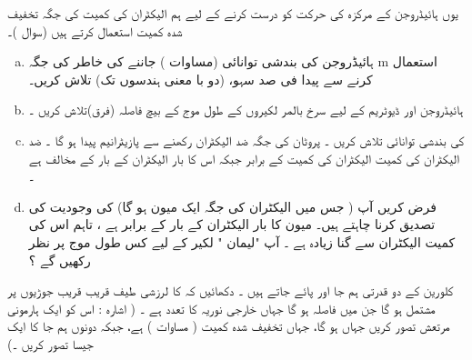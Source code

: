  یوں ہائیڈروجن کے مرکزہ کی حرکت کو درست کرنے کے لیے ہم الیکٹران  کی کمیت کی جگہ تخفیف شدہ کمیت استعمال کرتے ہیں  (سوال )۔ 
\begin{enumerate}[a.]
\item
 ہائیڈروجن کی بندشی  توانائی (مساوات ) جاننے کی خاطر   کی جگہ m استعمال کرنے سے پیدا فی صد  سہو،    (دو با معنی ہندسوں تک)    تلاش کریں۔  
\item
 ہائیڈروجن اور ڈیوٹریم کے لیے   سرخ بالمر لکیروں      کے طول موج کے بیچ    فاصلہ  (فرق)تلاش کریں ۔ 
\item
  کی بندشی توانائی تلاش کریں ۔ پروٹان کی جگہ  ضد الیکٹران رکھنے سے پازیٹرانیم پیدا ہو گا ۔ ضد الیکٹران کی کمیت   الیکٹران کی کمیت کے برابر   جبکہ اس کا بار    الیکٹران کے بار  کے مخالف ہے ۔ 
\item
 فرض کریں آپ   (    جس میں الیکٹران کی جگہ ایک میون  ہو گا) کی وجودیت  کی تصدیق کرنا  چاہتے  ہیں۔ میون کا بار  الیکٹران کے بار  کے برابر ہے ، تاہم  اس کی کمیت  الیکٹران سے گنا زیادہ   ہے ۔  آپ  "لیمان  "   لکیر    کے لیے کس طول  موج پر نظر رکھیں گے ؟
\end{enumerate}
کلورین کے دو  قدرتی   ہم جا    اور    پائے جاتے ہیں ۔ دکھائیں کہ   کا   لرزشی   طیف قریب قریب   جوڑیوں پر مشتمل ہو گا   جن میں فاصلہ    ہو گا جہاں  خارجی نوریہ کا تعدد ہے ۔  ( اشارہ : اس کو ایک ہارمونی مرتعش تصور کریں
 جہاں   ہو گا،    جہاں   تخفیف شدہ کمیت ( مساوات   ) ہے،    جبکہ  دونوں ہم جا  کا    ایک   جیسا تصور کریں ۔) 


